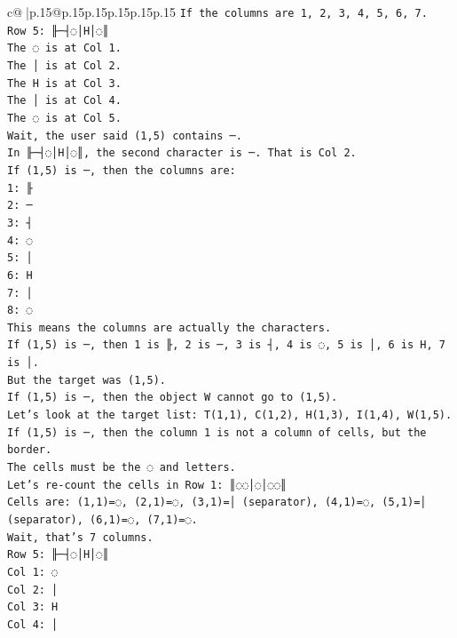 \documentclass{article}
\begin{document}
{\begin{supertabular}{c@{$\;$}|p{.15\linewidth}@{}p{.15\linewidth}p{.15\linewidth}p{.15\linewidth}p{.15\linewidth}p{.15\linewidth}}
{{{\texttt{If the columns are 1, 2, 3, 4, 5, 6, 7.} \\
\texttt{Row 5: ╟─┤◌│H│◌║} \\
\texttt{The ◌ is at Col 1.} \\
\texttt{The │ is at Col 2.} \\
\texttt{The H is at Col 3.} \\
\texttt{The │ is at Col 4.} \\
\texttt{The ◌ is at Col 5.} \\
\texttt{Wait, the user said (1,5) contains ─.} \\
\texttt{In ╟─┤◌│H│◌║, the second character is ─. That is Col 2.} \\
\texttt{If (1,5) is ─, then the columns are:} \\
\texttt{1: ╟} \\
\texttt{2: ─} \\
\texttt{3: ┤} \\
\texttt{4: ◌} \\
\texttt{5: │} \\
\texttt{6: H} \\
\texttt{7: │} \\
\texttt{8: ◌} \\
\texttt{This means the columns are actually the characters.} \\
\texttt{If (1,5) is ─, then 1 is ╟, 2 is ─, 3 is ┤, 4 is ◌, 5 is │, 6 is H, 7 is │.} \\
\texttt{But the target was (1,5).} \\
\texttt{If (1,5) is ─, then the object W cannot go to (1,5).} \\
\texttt{Let's look at the target list: T(1,1), C(1,2), H(1,3), I(1,4), W(1,5).} \\
\texttt{If (1,5) is ─, then the column 1 is not a column of cells, but the border.} \\
\texttt{The cells must be the ◌ and letters.} \\
\texttt{Let's re{-}count the cells in Row 1: ║◌◌│◌│◌◌║} \\
\texttt{Cells are: (1,1)=◌, (2,1)=◌, (3,1)=│ (separator), (4,1)=◌, (5,1)=│ (separator), (6,1)=◌, (7,1)=◌.} \\
\texttt{Wait, that's 7 columns.} \\
\texttt{Row 5: ╟─┤◌│H│◌║} \\
\texttt{Col 1: ◌} \\
\texttt{Col 2: │} \\
\texttt{Col 3: H} \\
\texttt{Col 4: │} \\
}}}
\end{supertabular}}
\end{document}
